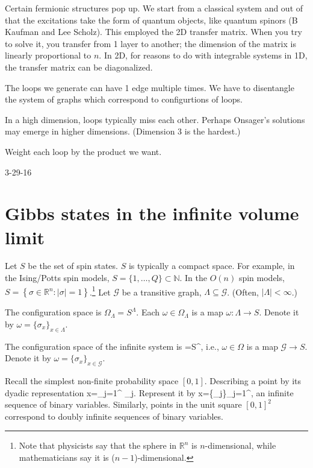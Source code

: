 \documentclass[12pt]{book}
\theoremstyle{norm}
\begin{document}
Certain fermionic structures pop up. We start from a classical system and out of that the excitations take the form of quantum objects, like quantum spinors (B Kaufman and Lee Scholz). This employed the 2D transfer matrix. When you try to solve it, you transfer from 1 layer to another; the dimension of the matrix is linearly proportional to $n$. In 2D, for reasons to do with integrable systems in 1D, the transfer matrix can be diagonalized. 


The loops we generate can have 1 edge multiple times. We have to disentangle the system of graphs which correspond to configurtions of loops. 

In a high dimension, loops typically miss each other. Perhaps Onsager's solutions may emerge in higher dimensions. (Dimension 3 is the hardest.)

Weight each loop by the product we want. 




{\color{blue}3-29-16}

\section{Gibbs states in the infinite volume limit}

Let $S$ be the set of spin states. $S$ is typically a compact space. For example, in the Ising/Potts spin models, $S=\{1,\ldots, Q\}\subset\mathbb{N}$. In the $O(n)$ spin models, $S=\left\{{\sigma\in \mathbb{R}^n}:{|\sigma|=1}\right\}$.\footnote{Note that physicists say that the sphere in $\mathbb{R}^n$ is $n$-dimensional, while mathematicians say it is ($n-1$)-dimensional.} Let $\mathcal{G}$ be a transitive graph, $\Lambda\subseteq\mathcal{G}$. (Often, $|\Lambda|<\infty$.)

The configuration space is $\Omega_{\Lambda}=S^{\Lambda}$. Each $\omega\in \Omega_{\Lambda}$ is a map $\omega:\Lambda\to S$. Denote it by $\omega=\{\sigma_x\}_{x\in \Lambda}$.

The configuration space of the infinite system is 
\be
\Omega=S^{},
\ee
i.e., $\omega\in \Omega$ is a map $\mathcal{G}\to S$. Denote it by $\omega=\{\sigma_x\}_{x\in \mathcal{G}}$.

Recall the simplest non-finite probability space $[0,1]$. 
Describing a point by its dyadic representation
\be
x=\sum_{j=1}^{\infty} \sigma_j.
\ee
Represent it by 
\be
x=\{\sigma_j\}_{j=1}^{\infty},
\ee
an infinite sequence of binary variables. Similarly, points in the unit square $[0,1]^2$ correspond to doubly infinite sequences of binary variables.
\end{document}
